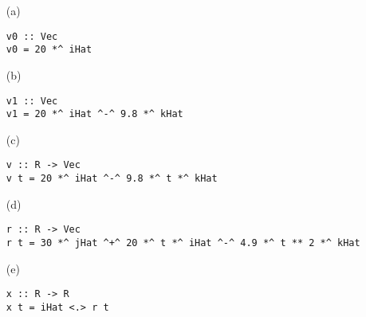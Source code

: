 
\begin{itemize}
    \item[(a)]
\scriptsize\begin{verbatim}
v0 :: Vec
v0 = 20 *^ iHat 
\end{verbatim}\normalsize
    \item[(b)]
\scriptsize\begin{verbatim}
v1 :: Vec
v1 = 20 *^ iHat ^-^ 9.8 *^ kHat
\end{verbatim}\normalsize
    \item[(c)]
\scriptsize\begin{verbatim}
v :: R -> Vec
v t = 20 *^ iHat ^-^ 9.8 *^ t *^ kHat
\end{verbatim}\normalsize
    \item[(d)]
\scriptsize\begin{verbatim}
r :: R -> Vec
r t = 30 *^ jHat ^+^ 20 *^ t *^ iHat ^-^ 4.9 *^ t ** 2 *^ kHat
\end{verbatim}\normalsize
    \item[(e)]
\scriptsize\begin{verbatim}
x :: R -> R
x t = iHat <.> r t
\end{verbatim}\normalsize
\end{itemize}
